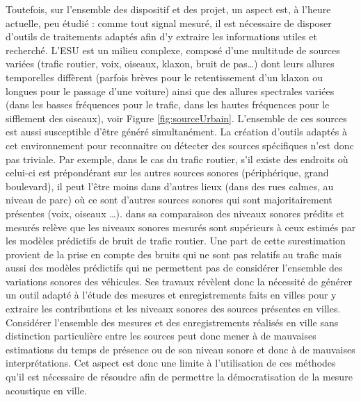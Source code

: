 Toutefois, sur l'ensemble des dispositif et des projet, un aspect est, à l'heure actuelle, peu étudié : comme tout signal mesuré, il est nécessaire de disposer d'outils de traitements  adaptés afin d'y extraire les informations utiles et recherché. L'ESU est un milieu complexe, composé d'une multitude de sources variées (trafic routier, voix, oiseaux, klaxon, bruit de pas\dots) dont leurs allures temporelles diffèrent (parfois brèves pour le retentissement d'un klaxon ou longues pour le passage d'une voiture) ainsi que des allures spectrales variées (dans les basses fréquences pour le trafic, dans les hautes fréquences pour le sifflement des oiseaux), voir Figure \ref{fig:sourceUrbain}. L'ensemble de ces sources est aussi susceptible d'être généré simultanément. La création d'outils adaptés à cet environnement pour reconnaitre ou détecter des sources spécifiques n'est donc pas triviale. Par exemple, dans le cas du trafic routier, s'il existe des endroits où celui-ci est prépondérant sur les autres sources sonores (périphérique, grand boulevard), il peut l'être moins dans d'autres lieux (dans des rues calmes, au niveau de parc) où ce sont d'autres sources sonores qui sont majoritairement présentes (voix, oiseaux \dots). 
\cite{Mioduszewski} dans sa comparaison des niveaux sonores prédits et mesurés relève que les niveaux sonores mesurés sont supérieurs à ceux estimés par les modèles prédictifs de bruit de trafic routier. Une part de cette surestimation provient de la prise en compte des bruits qui ne sont pas relatifs au trafic  mais aussi des modèles prédictifs qui ne permettent pas de considérer l'ensemble des variations sonores des véhicules. Ses travaux révèlent donc la nécessité de générer un outil adapté à l'étude des mesures et enregistrements faits en villes pour y extraire les contributions et les niveaux sonores des sources présentes en villes. Considérer l'ensemble des mesures et des enregistrements réalisés en ville sans distinction particulière entre les sources peut donc mener à de mauvaises estimations du temps de présence ou de son niveau sonore et donc à de mauvaises interprétations. Cet aspect est donc une limite à l'utilisation de ces méthodes qu'il est nécessaire de résoudre afin de permettre la démocratisation de la mesure acoustique en ville.\\

